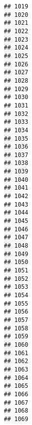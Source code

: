 \documentclass[
]{article}
\begin{document}
\begin{verbatim}
## 1019                                           
## 1020                                           
## 1021                                           
## 1022                                           
## 1023                                           
## 1024                                           
## 1025                                           
## 1026                                           
## 1027                                           
## 1028                                           
## 1029                                           
## 1030                                           
## 1031                                           
## 1032                                           
## 1033                                           
## 1034                                           
## 1035                                           
## 1036                                           
## 1037                                           
## 1038                                           
## 1039                                           
## 1040                                           
## 1041                                           
## 1042                                           
## 1043                                           
## 1044                                           
## 1045                                           
## 1046                                           
## 1047                                           
## 1048                                           
## 1049                                           
## 1050                                           
## 1051                                           
## 1052                                           
## 1053                                           
## 1054                                           
## 1055                                           
## 1056                                           
## 1057                                           
## 1058                                           
## 1059                                           
## 1060                                           
## 1061                                           
## 1062                                           
## 1063                                           
## 1064                                           
## 1065                                           
## 1066                                           
## 1067                                           
## 1068                                           
## 1069                                           

\end{verbatim}
\end{document}

